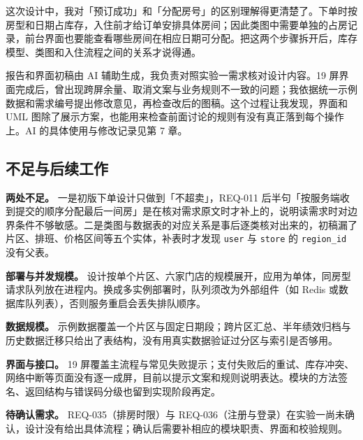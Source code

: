 这次设计中，我对「预订成功」和「分配房号」的区别理解得更清楚了。下单时按房型和日期占库存，入住前才给订单安排具体房间；因此类图中需要单独的占房记录，前台界面也要能查看哪些房间在相应日期可分配。把这两个步骤拆开后，库存模型、类图和入住流程之间的关系才说得通。

报告和界面初稿由 AI 辅助生成，我负责对照实验一需求核对设计内容。19 屏界面完成后，曾出现跨屏余量、取消文案与业务规则不一致的问题；我依据统一示例数据和需求编号提出修改意见，再检查改后的图稿。这个过程让我发现，界面和 UML 图除了展示方案，也能用来检查前面讨论的规则有没有真正落到每个操作上。AI 的具体使用与修改记录见第 7 章。

\subsection{不足与后续工作}

\textbf{两处不足。} 一是初版下单设计只做到「不超卖」，REQ-011 后半句「按服务端收到提交的顺序分配最后一间房」是在核对需求原文时才补上的，说明读需求时对边界条件不够敏感。二是类图与数据表的对应关系是事后逐类核对出来的，初稿漏了片区、排班、价格区间等五个实体，补表时才发现 \texttt{user} 与 \texttt{store} 的 \texttt{region\_id} 没有父表。

\textbf{部署与并发规模。} 设计按单个片区、六家门店的规模展开，应用为单体，同房型请求队列放在进程内。换成多实例部署时，队列须改为外部组件（如 Redis 或数据库队列表），否则服务重启会丢失排队顺序。

\textbf{数据规模。} 示例数据覆盖一个片区与固定日期段；跨片区汇总、半年绩效归档与历史数据迁移只给出了表结构，没有用真实数据验证过分区与索引是否够用。

\textbf{界面与接口。} 19 屏覆盖主流程与常见失败提示；支付失败后的重试、库存冲突、网络中断等页面没有逐一成屏，目前以提示文案和规则说明表达。模块的方法签名、返回结构与错误码分级也留到实现阶段再定。

\textbf{待确认需求。} REQ-035（排房时限）与 REQ-036（注册与登录）在实验一尚未确认，设计没有给出具体流程；确认后需要补相应的模块职责、界面和校验规则。
